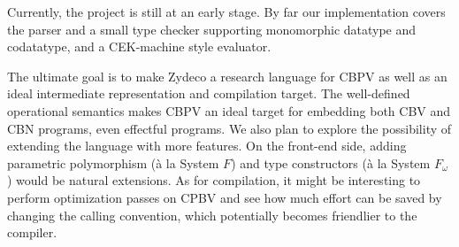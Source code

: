 \documentclass[acmsmall,nonacm]{acmart}
\begin{document}
Currently, the project is still at an early stage. By far our implementation covers the parser and a small type checker supporting monomorphic datatype and codatatype, and a CEK-machine style evaluator.

The ultimate goal is to make Zydeco a research language for CBPV as well as an ideal intermediate representation and compilation target. The well-defined operational semantics makes CBPV an ideal target for embedding both CBV and CBN programs, even effectful programs. We also plan to explore the possibility of extending the language with more features. On the front-end side, adding parametric polymorphism (à la System $F$) and type constructors (à la System $F_\omega$) would be natural extensions. As for compilation, it might be interesting to perform optimization passes on CPBV and see how much effort can be saved by changing the calling convention, which potentially becomes friendlier to the compiler.
\end{document}
